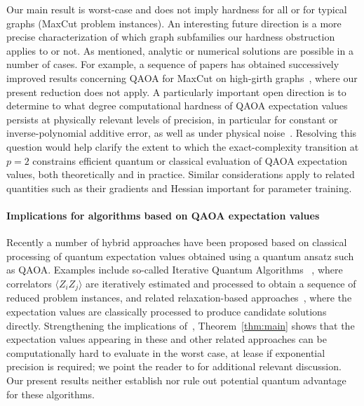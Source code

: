 \documentclass[11pt]{article}
\newcommand{\sh}[1]{{#1}}
\begin{document}
Our main result is worst-case and %
does not imply hardness for all or for typical graphs (MaxCut problem instances). 
An interesting future direction is a more precise characterization of which graph subfamilies our hardness obstruction applies to or not. 
As mentioned, analytic or numerical solutions are possible in a number of cases. For example, a sequence of papers has obtained successively improved results concerning QAOA for MaxCut on high-girth graphs~\cite{Wang2018,hastings2019classical,wurtz2021maxcut,marwaha2021local,barak2021classical,basso2021quantum,sureshbabu2024parameter,farhi2025lower}, where our present reduction %
does not apply. 
\sh{A particularly important open direction is to determine %
to what degree computational hardness of QAOA expectation values persists
at physically relevant levels of precision, in particular for constant or inverse-polynomial
additive error, as well as under physical noise~\cite{marshall2020characterizing}. Resolving this question would help clarify the extent to which the
exact-complexity transition at $p=2$ constrains efficient quantum or classical %
evaluation 
of QAOA expectation values, both theoretically and in practice. Similar considerations apply to related quantities such as their gradients and Hessian important for parameter training.}


\paragraph{Implications for algorithms based on QAOA expectation values}
Recently a number of hybrid approaches have been proposed based on classical processing of quantum expectation values obtained using a quantum ansatz such as QAOA. 
Examples include so-called %
Iterative %
Quantum Algorithms%
~\cite{bravyi2020obstacles,bravyi2020hybrid,dupont2023quantum,MIS,Finzgar2023,brady2025quantum,wybo2026scalable}, where %
correlators $\langle Z_iZ_j\rangle$ %
are iteratively estimated and processed to obtain a sequence of reduced problem instances, %
and related relaxation-based approaches~\cite{dupont2024extending,maciejewski2024multilevel}, where the 
expectation values are classically processed to  produce candidate solutions directly. 
Strengthening the implications of~\cite{WangEtAl2025}, Theorem~\ref{thm:main} shows that the expectation values %
appearing in these and other related approaches can be computationally hard to evaluate in the worst case, at lease if exponential precision is required;  
we point the reader to \cite[Sec. III.D]{wybo2026scalable} for additional relevant discussion. %
Our present %
results neither establish nor rule out %
potential quantum
advantage for these algorithms. 
\end{document}
